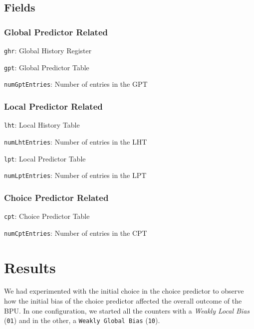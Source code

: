 \documentclass[12pt,a4paper,english]{paper}
\begin{document}
\subsection{Fields}
    \subsubsection{Global Predictor Related}
    \begin{compactitem}
        \item \texttt{ghr}: Global History Register
        \item \texttt{gpt}: Global Predictor Table
        \item \texttt{numGptEntries}: Number of entries in the GPT
    \end{compactitem}

    \subsubsection{Local Predictor Related}
    \begin{compactitem}
        \item \texttt{lht}: Local History Table
        \item \texttt{numLhtEntries}: Number of entries in the LHT
        \item \texttt{lpt}: Local Predictor Table
        \item \texttt{numLptEntries}: Number of entries in the LPT
    \end{compactitem}

    \subsubsection{Choice Predictor Related}
    \begin{compactitem}
        \item \texttt{cpt}: Choice Predictor Table
        \item \texttt{numCptEntries}: Number of entries in the CPT
    \end{compactitem}
    
\section{Results}
We had experimented with the initial choice in the choice predictor to observe how the initial bias of the choice predictor affected the overall outcome of the BPU. In one configuration, we started all the counters with a \textit{Weakly Local Bias} (\texttt{01}) and in the other, a \texttt{Weakly Global Bias} (\texttt{10}).
\end{document}
